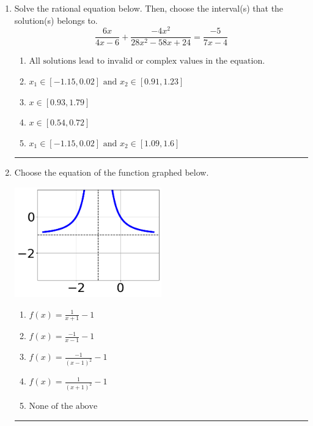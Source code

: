 \documentclass[14pt]{extbook}
\newcommand{\litem}[1]{\item#1\hspace*{-1cm}\rule{\textwidth}{0.4pt}}
\begin{document}
\begin{enumerate}
{\begin{enumerate}[label=\Alph*.]
\end{enumerate} }
\litem{
Solve the rational equation below. Then, choose the interval(s) that the solution(s) belongs to.\[ \frac{6x}{4x -6} + \frac{-4x^{2}}{28x^{2} -58 x + 24} = \frac{-5}{7x -4} \]\begin{enumerate}[label=\Alph*.]
\item \( \text{All solutions lead to invalid or complex values in the equation.} \)
\item \( x_1 \in [-1.15, 0.02] \text{ and } x_2 \in [0.91,1.23] \)
\item \( x \in [0.93,1.79] \)
\item \( x \in [0.54,0.72] \)
\item \( x_1 \in [-1.15, 0.02] \text{ and } x_2 \in [1.09,1.6] \)

\end{enumerate} }
\litem{
Choose the equation of the function graphed below.
\begin{center}
    \includegraphics[width=0.5\textwidth]{../Figures/rationalGraphToEquationA.png}
\end{center}
\begin{enumerate}[label=\Alph*.]
\item \( f(x) = \frac{1}{x + 1} - 1 \)
\item \( f(x) = \frac{-1}{x - 1} - 1 \)
\item \( f(x) = \frac{-1}{(x - 1)^2} - 1 \)
\item \( f(x) = \frac{1}{(x + 1)^2} - 1 \)
\item \( \text{None of the above} \)


\end{enumerate}}
\end{enumerate}
\end{document}
